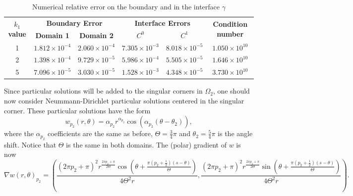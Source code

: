 \begin{table}[!htbp]
    \centering
    \begin{tabular}{cccccc}
      \toprule
      \multirow{2}{*}{\textbf{\(k_1\) value}} & \multicolumn{2}{c}{\textbf{Boundary Error}} & \multicolumn{2}{c}{\textbf{Interface Errors}} & \multirow{2}{*}{\textbf{Condition number}} \\
      \cmidrule(lr){2-3} \cmidrule(lr){4-5}
      & \textbf{Domain 1} & \textbf{Domain 2} & \textbf{\(C^0\)} & \textbf{\(C^1\)} & \\
      \midrule
      1 & $1.812\times10^{-4}$ & $2.060\times10^{-4}$ & $7.305\times10^{-3}$ & $8.018\times10^{-5}$ & $1.050\times 10^{10}$ \\
      2 & $1.398\times10^{-4}$ & $9.729\times10^{-5}$ & $5.986\times10^{-4}$ & $5.505\times10^{-5}$ & $1.646\times 10^{10}$ \\
      5 & $7.096\times10^{-5}$ & $3.030\times10^{-5}$ & $1.528\times10^{-3}$ & $4.348\times10^{-5}$ & $3.730\times 10^{10}$ \\
      \bottomrule
    \end{tabular}
    \caption{Numerical relative error on the boundary and in the interface \(\gamma\)}
    \label{tab:transmission_results_L_shape_axis}
\end{table}

Since particular solutions will be added to the singular corners in \(\Omega_2\), one should now consider Neummann-Dirichlet particular solutions centered in the singular corner. These particular solutions have the form
\[
    w_{p_2}(r,\theta) = \alpha_{p_2} r^{\alpha_{p_2}}\cos(\alpha_{p_2}(\theta-\theta_2)),
\]
where the \(\alpha_{p_2}\) coefficients are the same as before, \(\Theta = \frac{3}{4}\pi\) and \(\theta_2=\frac{5}{4}\pi\) is the angle shift. Notice that \(\Theta\) is the same in both domains. The (polar) gradient of \(w\) is now
\begin{equation*}
    \nabla w(r,\theta)_{p_2} = \left(\frac{(2 \pi  {p_2}+\pi )^2 r^{\frac{2 \pi  {p_2}+\pi }{2 \Theta }} \cos \left(\theta +\frac{\pi  \left({p_2}+\frac{1}{2}\right) (s-\theta )}{\Theta }\right)}{4 \Theta ^2 r},\frac{(2 \pi  {p_2}+\pi )^2 r^{\frac{2 \pi  {p_2}+\pi }{2 \Theta }} \sin \left(\theta +\frac{\pi  \left({p_2}+\frac{1}{2}\right) (s-\theta )}{\Theta }\right)}{4 \Theta ^2 r}\right).
\end{equation*}

